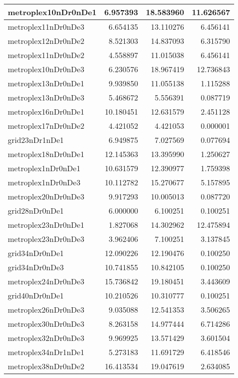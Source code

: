 \begin{longtable}{|l|r|r|r|}
\endfoot
\hline
\endlastfoot
metroplex10nDr0nDe1 & 6.957393 & 18.583960 & 11.626567 \\\hline
metroplex11nDr0nDe3 & 6.654135 & 13.110276 & 6.456141 \\\hline
metroplex12nDr0nDe2 & 8.521303 & 14.837093 & 6.315790 \\\hline
metroplex11nDr0nDe2 & 4.558897 & 11.015038 & 6.456141 \\\hline
metroplex10nDr0nDe3 & 6.230576 & 18.967419 & 12.736843 \\\hline
metroplex13nDr0nDe1 & 9.939850 & 11.055138 & 1.115288 \\\hline
metroplex13nDr0nDe3 & 5.468672 & 5.556391 & 0.087719 \\\hline
metroplex16nDr0nDe1 & 10.180451 & 12.631579 & 2.451128 \\\hline
metroplex17nDr0nDe2 & 4.421052 & 4.421053 & 0.000001 \\\hline
grid23nDr1nDe1 & 6.949875 & 7.027569 & 0.077694 \\\hline
metroplex18nDr0nDe1 & 12.145363 & 13.395990 & 1.250627 \\\hline
metroplex1nDr0nDe1 & 10.631579 & 12.390977 & 1.759398 \\\hline
metroplex1nDr0nDe3 & 10.112782 & 15.270677 & 5.157895 \\\hline
metroplex20nDr0nDe3 & 9.917293 & 10.005013 & 0.087720 \\\hline
grid28nDr0nDe1 & 6.000000 & 6.100251 & 0.100251 \\\hline
metroplex23nDr0nDe1 & 1.827068 & 14.302962 & 12.475894 \\\hline
metroplex23nDr0nDe3 & 3.962406 & 7.100251 & 3.137845 \\\hline
grid34nDr0nDe1 & 12.090226 & 12.190476 & 0.100250 \\\hline
grid34nDr0nDe3 & 10.741855 & 10.842105 & 0.100250 \\\hline
metroplex24nDr0nDe3 & 15.736842 & 19.180451 & 3.443609 \\\hline
grid40nDr0nDe1 & 10.210526 & 10.310777 & 0.100251 \\\hline
metroplex26nDr0nDe3 & 9.035088 & 12.541353 & 3.506265 \\\hline
metroplex30nDr0nDe3 & 8.263158 & 14.977444 & 6.714286 \\\hline
metroplex32nDr0nDe3 & 9.969925 & 13.571429 & 3.601504 \\\hline
metroplex34nDr1nDe1 & 5.273183 & 11.691729 & 6.418546 \\\hline
metroplex38nDr0nDe2 & 16.413534 & 19.047619 & 2.634085 \\\hline

\end{longtable}
